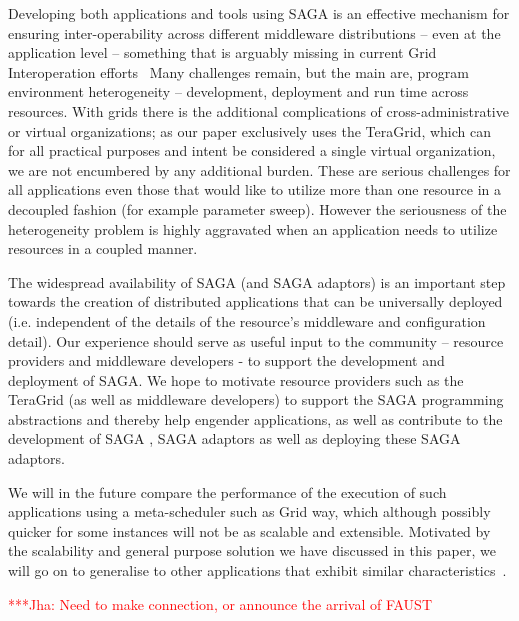 \documentclass[conference,final]{IEEEtran}
\newcommand{\jhanote}[1]{ {\textcolor{red} { ***Jha: #1 }}}
\begin{document}
Developing both applications and tools using SAGA is an effective
mechanism for ensuring inter-operability across different middleware
distributions -- even at the application level -- something that is
arguably missing in current Grid Interoperation
efforts~\cite{gin_paper} Many challenges remain, but the main are,
program environment heterogeneity -- development, deployment and run
time across resources.  With grids there is the additional
complications of cross-administrative or virtual organizations; as our
paper exclusively uses the TeraGrid, which can for all practical
purposes and intent be considered a single virtual organization, we
are not encumbered by any additional burden. These are serious
challenges for all applications even those that would like to utilize
more than one resource in a decoupled fashion (for example parameter
sweep).  However the seriousness of the heterogeneity problem is
highly aggravated when an application needs to utilize resources in a
coupled manner.

The widespread availability of SAGA (and SAGA adaptors) is an
important step towards the creation of distributed applications that
can be universally deployed (i.e.  independent of the details of the
resource's middleware and configuration detail).  Our experience
should serve as useful input to the community -- resource providers
and middleware developers - to support the development and deployment
of SAGA.  We hope to motivate  resource providers such as the TeraGrid
(as well as middleware developers) to support the SAGA programming
abstractions and thereby help engender applications, as well as
contribute to the development of SAGA , SAGA adaptors as well as
deploying these SAGA adaptors.

We will in the future compare the performance of the execution of such
applications using a meta-scheduler such as Grid way, which although
possibly quicker for some instances will not be as scalable and
extensible. Motivated by the scalability and general purpose solution
we have discussed in this paper, we will go on to generalise to other
applications that exhibit similar characteristics~\cite{nature99}.

\jhanote{Need to make connection, or announce the arrival of FAUST}



\end{document}
